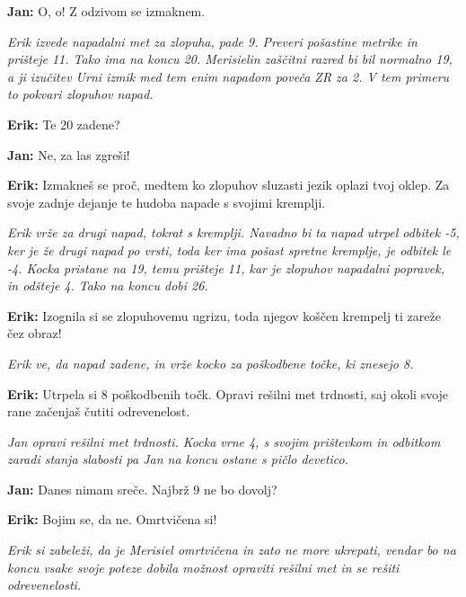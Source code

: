 \textbf{Jan:} O, o! Z odzivom se izmaknem.

\vspace{20pt}
\textit{Erik izvede napadalni met za zlopuha, pade 9. Preveri pošastine metrike in prišteje 11. Tako ima na koncu 20. Merisielin zaščitni razred bi bil normalno 19, a ji izučitev Urni izmik med tem enim napadom poveča ZR za 2. V tem primeru to pokvari zlopuhov napad.}
\vspace{20pt}

\textbf{Erik:} Te 20 zadene?

\textbf{Jan:} Ne, za las zgreši!

\textbf{Erik:} Izmakneš se proč, medtem ko zlopuhov sluzasti jezik oplazi tvoj oklep. Za svoje zadnje dejanje te hudoba napade s svojimi kremplji.

\vspace{20pt}
\textit{Erik vrže za drugi napad, tokrat s kremplji. Navadno bi ta napad utrpel odbitek -5, ker je že drugi napad po vrsti, toda ker ima pošast spretne kremplje, je odbitek le -4. Kocka pristane na 19, temu prišteje 11, kar je zlopuhov napadalni popravek, in odšteje 4. Tako na koncu dobi 26.}
\vspace{20pt}

\textbf{Erik:} Izognila si se zlopuhovemu ugrizu, toda njegov koščen krempelj ti zareže čez obraz!

\vspace{20pt}
\textit{Erik ve, da napad zadene, in vrže kocko za poškodbene točke, ki znesejo 8.}
\vspace{20pt}

\textbf{Erik:} Utrpela si 8 poškodbenih točk. Opravi rešilni met trdnosti, saj okoli svoje rane začenjaš čutiti odrevenelost.

\vspace{20pt}
\textit{Jan opravi rešilni met trdnosti. Kocka vrne 4, s svojim prištevkom in odbitkom zaradi stanja slabosti pa Jan na koncu ostane s pičlo devetico.}
\vspace{20pt}

\textbf{Jan:} Danes nimam sreče. Najbrž 9 ne bo dovolj?

\textbf{Erik:} Bojim se, da ne. Omrtvičena si!

\vspace{20pt}
\textit{Erik si zabeleži, da je Merisiel omrtvičena in zato ne more ukrepati, vendar bo na koncu vsake svoje poteze dobila možnost opraviti rešilni met in se rešiti odrevenelosti.}
\vspace{20pt}

